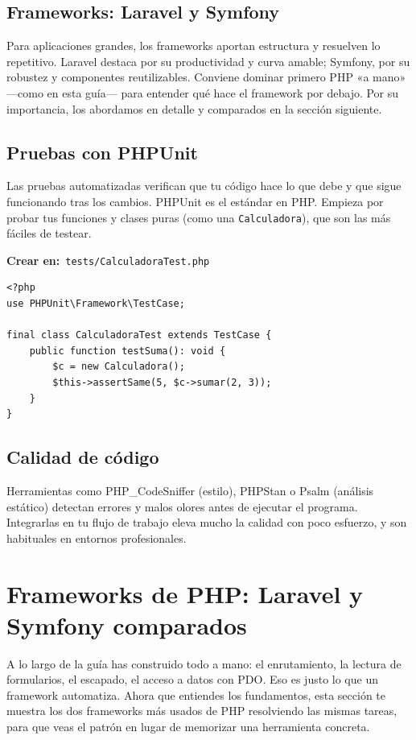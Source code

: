 \documentclass[11pt]{article}
\begin{document}
\subsection{Frameworks: Laravel y Symfony}
Para aplicaciones grandes, los frameworks aportan estructura y resuelven lo repetitivo. Laravel destaca por su productividad y curva amable; Symfony, por su robustez y componentes reutilizables. Conviene dominar primero PHP «a mano» —como en esta guía— para entender qué hace el framework por debajo. Por su importancia, los abordamos en detalle y comparados en la sección siguiente.

\subsection{Pruebas con PHPUnit}
Las pruebas automatizadas verifican que tu código hace lo que debe y que sigue funcionando tras los cambios. PHPUnit es el estándar en PHP. Empieza por probar tus funciones y clases puras (como una \texttt{Calculadora}), que son las más fáciles de testear.

{\small\color{phpazulo}\textbf{Crear en:}~}\texttt{tests/\allowbreak{}CalculadoraTest.\allowbreak{}php}\par\nobreak\vspace{-1pt}
\begin{cajacodigo}
\begin{lstlisting}[style=php]
<?php
use PHPUnit\Framework\TestCase;

final class CalculadoraTest extends TestCase {
    public function testSuma(): void {
        $c = new Calculadora();
        $this->assertSame(5, $c->sumar(2, 3));
    }
}
\end{lstlisting}
\end{cajacodigo}
\vspace{2pt}
\subsection{Calidad de código}
Herramientas como PHP\_CodeSniffer (estilo), PHPStan o Psalm (análisis estático) detectan errores y malos olores antes de ejecutar el programa. Integrarlas en tu flujo de trabajo eleva mucho la calidad con poco esfuerzo, y son habituales en entornos profesionales.

\section{Frameworks de PHP: Laravel y Symfony comparados}
A lo largo de la guía has construido todo a mano: el enrutamiento, la lectura de formularios, el escapado, el acceso a datos con PDO. Eso es justo lo que un framework automatiza. Ahora que entiendes los fundamentos, esta sección te muestra los dos frameworks más usados de PHP resolviendo las mismas tareas, para que veas el patrón en lugar de memorizar una herramienta concreta.
\end{document}
